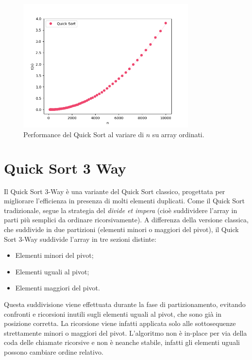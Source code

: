 \documentclass[a4paper, 12pt, oneside]{book}
\begin{document}
\begin{figure}[H]
    \centering
    \includegraphics[width=0.8\textwidth]{images/quickSortCasoPeggiore.png}
    \caption{Performance del Quick Sort al variare di \(n\) su array ordinati.}
    \label{fig:quick_sort_n}
\end{figure}


\chapter{Quick Sort 3 Way}\label{chap:Quick Sort 3 Way} %

Il Quick Sort 3-Way è una variante del Quick Sort classico, progettata per migliorare l'efficienza in presenza di molti elementi duplicati. Come il Quick Sort tradizionale, segue la strategia del \textit{divide et impera} (cioè suddividere l'array in parti più semplici da ordinare ricorsivamente).
A differenza della versione classica, che suddivide in due partizioni (elementi minori o maggiori del pivot), il Quick Sort 3-Way suddivide l'array in tre sezioni distinte:

\begin{itemize}
    \item Elementi minori del pivot;
    \item Elementi uguali al pivot;
    \item Elementi maggiori del pivot.
\end{itemize}

\noindent Questa suddivisione viene effettuata durante la fase di partizionamento, evitando confronti e ricorsioni inutili sugli elementi uguali al pivot, che sono già in posizione corretta. La ricorsione viene infatti applicata solo alle sottosequenze strettamente minori o maggiori del pivot.
L'algoritmo non è in-place per via della coda delle chiamate ricorsive e non è neanche stabile, infatti gli elementi uguali possono cambiare ordine relativo.
\end{document}
